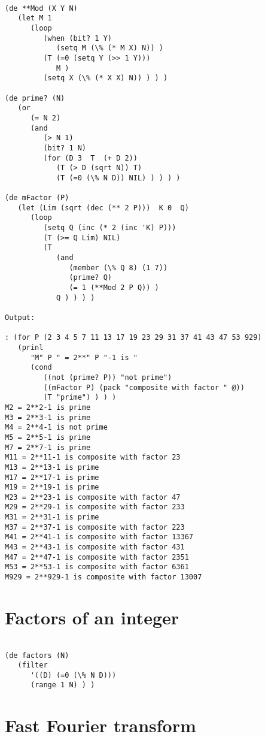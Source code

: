 \begin{verbatim}

(de **Mod (X Y N)
   (let M 1
      (loop
         (when (bit? 1 Y)
            (setq M (\% (* M X) N)) )
         (T (=0 (setq Y (>> 1 Y)))
            M )
         (setq X (\% (* X X) N)) ) ) )

(de prime? (N)
   (or
      (= N 2)
      (and
         (> N 1)
         (bit? 1 N)
         (for (D 3  T  (+ D 2))
            (T (> D (sqrt N)) T)
            (T (=0 (\% N D)) NIL) ) ) ) )

(de mFactor (P)
   (let (Lim (sqrt (dec (** 2 P)))  K 0  Q)
      (loop
         (setq Q (inc (* 2 (inc 'K) P)))
         (T (>= Q Lim) NIL)
         (T
            (and
               (member (\% Q 8) (1 7))
               (prime? Q)
               (= 1 (**Mod 2 P Q)) )
            Q ) ) ) )

Output:

: (for P (2 3 4 5 7 11 13 17 19 23 29 31 37 41 43 47 53 929)
   (prinl
      "M" P " = 2**" P "-1 is "
      (cond
         ((not (prime? P)) "not prime")
         ((mFactor P) (pack "composite with factor " @))
         (T "prime") ) ) )
M2 = 2**2-1 is prime
M3 = 2**3-1 is prime
M4 = 2**4-1 is not prime
M5 = 2**5-1 is prime
M7 = 2**7-1 is prime
M11 = 2**11-1 is composite with factor 23
M13 = 2**13-1 is prime
M17 = 2**17-1 is prime
M19 = 2**19-1 is prime
M23 = 2**23-1 is composite with factor 47
M29 = 2**29-1 is composite with factor 233
M31 = 2**31-1 is prime
M37 = 2**37-1 is composite with factor 223
M41 = 2**41-1 is composite with factor 13367
M43 = 2**43-1 is composite with factor 431
M47 = 2**47-1 is composite with factor 2351
M53 = 2**53-1 is composite with factor 6361
M929 = 2**929-1 is composite with factor 13007

\end{verbatim}

\section*{Factors of an integer}

\begin{verbatim}

(de factors (N)
   (filter
      '((D) (=0 (\% N D)))
      (range 1 N) ) )

\end{verbatim}

\section*{Fast Fourier transform}

